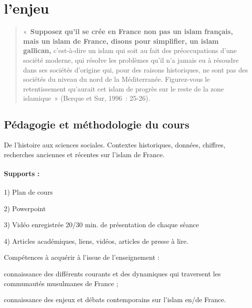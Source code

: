 \section{l'enjeu}
\begin{quote}
    « \textbf{Supposez qu’il se crée en France non pas un islam français, mais un islam de France, disons pour simplifier, un islam gallican,} c’est-à-dire un islam qui soit au fait des préoccupations d’une société moderne, qui résolve les problèmes qu’il n’a jamais eu à résoudre dans ses sociétés d’origine qui, pour des raisons historiques, ne sont pas des sociétés du niveau du nord de la Méditerranée. Figurez-vous le retentissement qu’aurait cet islam de progrès sur le reste de la zone islamique » (Berque et Sur, 1996 : 25-26).

\end{quote}

\subsection{Pédagogie et méthodologie du cours}
De l’histoire aux sciences sociales. Contextes
historiques, données, chiffres, recherches anciennes et récentes sur l’islam de France.

\paragraph{Supports :} 
\bi
\item 1) Plan de cours 
\item 2) Powerpoint 
\item 3) Vidéo enregistrée 20/30 min. de
présentation de chaque séance 
\item 4) Articles académiques, liens, vidéos, articles de presse
à lire.
\ei


Compétences à acquérir à l’issue de l’enseignement : 
\bi
\item connaissance des différents
courants et des dynamiques qui traversent les communautés musulmanes de France ;
\item connaissance des enjeux et débats contemporains sur l’islam en/de France. 
\ei


